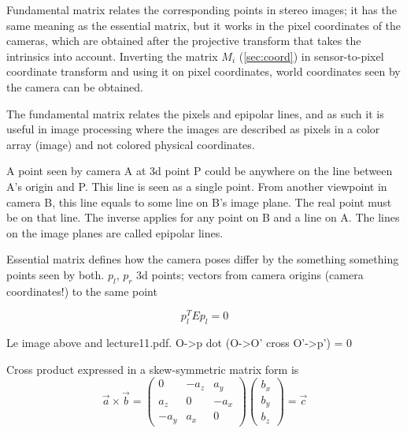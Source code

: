 Fundamental matrix relates the corresponding points in stereo images; it has the same meaning as the essential matrix, but it works in the pixel coordinates of the cameras, which are obtained after the projective transform that takes the intrinsics into account.
Inverting the matrix $M_i$ (\ref{sec:coord}) in sensor-to-pixel coordinate transform and using it on pixel coordinates, world coordinates seen by the camera can be obtained. %

%
%
%
%

The fundamental matrix relates the pixels and epipolar lines, and as such it is useful in image processing where the images are described as pixels in a color array (image) and not colored physical coordinates.


A point seen by camera A at 3d point P could be anywhere on the line between A's origin and P.
This line is seen as a single point.
From another viewpoint in camera B, this line equals to some line on B's image plane.
The real point must be on that line.
The inverse applies for any point on B and a line on A.
The lines on the image planes are called epipolar lines.

Essential matrix defines how the camera poses differ by the something something points seen by both. $p_l$, $p_r$ 3d points; vectors from camera origins (camera coordinates!) to the same point

\[
	p_l^T E p_l = 0
\]

Le image above and lecture11.pdf. O->p dot (O->O' cross O'->p') = 0

Cross product expressed in a skew-symmetric matrix form is
\begin{equation}
\vec a \times \vec b =
\begin{pmatrix}
	 0   & -a_z &  a_y\\
	 a_z &  0   & -a_x\\
	-a_y &  a_x & 0
\end{pmatrix}
\begin{pmatrix}
	b_x\\b_y\\b_z
\end{pmatrix}
= \vec c
\end{equation}

